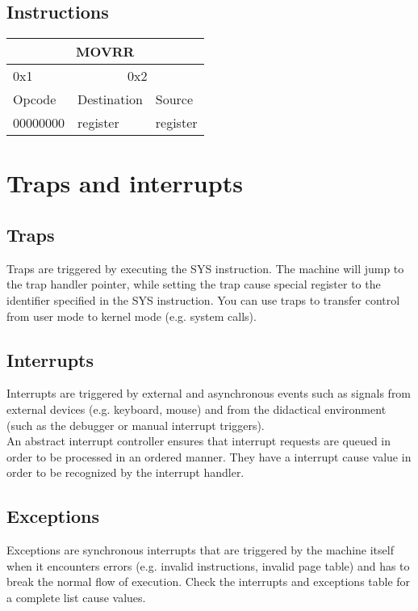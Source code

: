 \documentclass{article}
\begin{document}
\subsection{Instructions}
\begin{table}[h!]
\centering
\begin{tabular} { | p{2cm} | | p{2cm} | p{2cm} |}
  \hline
  \multicolumn{3}{|c|}{MOVRR}\\
  \hline
  0x1 & \multicolumn{2}{|c|}{0x2}\\
  \hline
  Opcode & Destination & Source\\
  00000000 & register & register\\
  \hline
\end{tabular}
\end{table}

\section{Traps and interrupts}
\subsection{Traps}
Traps are triggered by executing the SYS instruction. The machine will jump to the trap handler pointer, while setting the trap cause special register to the identifier specified in the SYS instruction. You can use traps to transfer control from user mode to kernel mode (e.g. system calls).
\subsection{Interrupts}
Interrupts are triggered by external and asynchronous events such as signals from external devices (e.g. keyboard, mouse) and from the didactical environment (such as the debugger or manual interrupt triggers). \\An abstract interrupt controller ensures that interrupt requests are queued in order to be processed in an ordered manner. They have a interrupt cause value in order to be recognized by the interrupt handler.
\subsection{Exceptions}
Exceptions are synchronous interrupts that are triggered by the machine itself when it encounters errors (e.g. invalid instructions, invalid page table) and has to break the normal flow of execution. Check the interrupts and exceptions table for a complete list cause values.

\newpage
\end{document}
